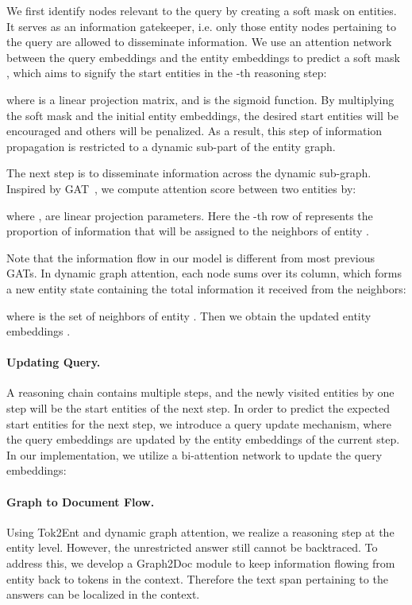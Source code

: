 \documentclass[11pt,a4paper]{article}
\begin{document}
We first identify nodes relevant to the query by creating a soft mask on entities. 
It serves as an information gatekeeper, i.e. only those entity nodes pertaining to the query are allowed to disseminate information. 
We use an attention network between the query embeddings and the entity embeddings to predict a soft mask , which aims to signify the start entities in the -th reasoning step:

where  is a linear projection matrix,  and  is the sigmoid function.
By multiplying the soft mask and the initial entity embeddings, the desired start entities will be encouraged and others will be penalized. As a result, this step of information propagation is restricted to a dynamic sub-part of the entity graph.

The next step is to disseminate information across the dynamic sub-graph.
Inspired by GAT~\cite{velivckovic2017graph}, we compute attention score  between two entities by:

where ,  are linear projection parameters.
Here the -th row of  represents the proportion of information that will be assigned to the neighbors of entity . 

Note that the information flow in our model is different from most previous GATs. In dynamic graph attention, each node sums over its column, which forms a new entity state containing the total information it received from the neighbors:

where  is the set of neighbors of entity . Then we obtain the updated entity embeddings . 







\paragraph{Updating Query.}
A reasoning chain contains multiple steps, and the newly visited entities by one step will be the start entities of the next step.
In order to predict the expected start entities for the next step,
we introduce a query update mechanism, where the query embeddings are updated by the entity embeddings of the current step. In our implementation, we utilize a bi-attention network \cite{seo2016bidirectional} to update the query embeddings:


\paragraph{Graph to Document Flow.}
Using Tok2Ent and dynamic graph attention, we realize a reasoning step at the entity level. 
However, the unrestricted answer still cannot be backtraced. 
To address this, we develop a Graph2Doc module to keep information flowing from entity back to tokens in the context. 
Therefore the text span pertaining to the answers can be localized in the context. 
\end{document}
